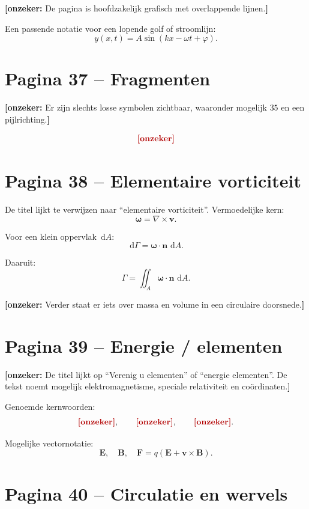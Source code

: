 \documentclass[11pt,a4paper]{article}
\newcommand{\onzeker}[1]{\ifmmode\text{\color{red!70!black}\bfseries[onzeker]}\else\textcolor{red!70!black}{\textbf{[onzeker:} #1\textbf{]}}\fi}
\newcommand{\dd}{\,\mathrm{d}}
\newcommand{\curl}{\nabla\times}
\begin{document}
\onzeker{De pagina is hoofdzakelijk grafisch met overlappende lijnen.}

Een passende notatie voor een lopende golf of stroomlijn:
\[
    y(x,t)=A\sin(kx-\omega t+\varphi).
\]

\section*{Pagina 37 -- Fragmenten}

\onzeker{Er zijn slechts losse symbolen zichtbaar, waaronder mogelijk $35$ en een pijlrichting.}

\[
    \onzeker{\text{schetsmatige vervolgpagina}}
\]

\section*{Pagina 38 -- Elementaire vorticiteit}

De titel lijkt te verwijzen naar ``elementaire vorticiteit''. Vermoedelijke kern:
\[
    \bm{\omega}
    =
    \curl\mathbf{v}.
\]

Voor een klein oppervlak $\dd A$:
\[
    \dd\Gamma
    =
    \bm{\omega}\cdot\mathbf{n}\,\dd A .
\]

Daaruit:
\[
    \Gamma
    =
    \iint_A \bm{\omega}\cdot\mathbf{n}\,\dd A .
\]

\onzeker{Verder staat er iets over massa en volume in een circulaire doorsnede.}

\section*{Pagina 39 -- Energie / elementen}

\onzeker{De titel lijkt op ``Verenig u elementen'' of ``energie elementen''. De tekst noemt mogelijk elektromagnetisme, speciale relativiteit en coördinaten.}

Genoemde kernwoorden:
\[
    \onzeker{\text{elektromagnetisme}},
    \qquad
    \onzeker{\text{speciale relativiteit}},
    \qquad
    \onzeker{\text{coördinatenstelsel}}.
\]

Mogelijke vectornotatie:
\[
    \mathbf{E},\quad \mathbf{B},\quad
    \mathbf{F}=q\left(\mathbf{E}+\mathbf{v}\times\mathbf{B}\right).
\]

\section*{Pagina 40 -- Circulatie en wervels}
\end{document}
